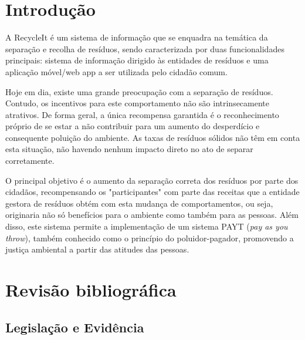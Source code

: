 \documentclass[11pt, a4paper, oneside]{book}
\begin{document}
\frontmatter

{
\linespread{1.000}

\tableofcontents
}

\printglossaries
\glsaddallunused

\mainmatter

\chapter{Introdução}

A RecycleIt é um sistema de informação que se enquadra na temática da separação e recolha de resíduos, sendo caracterizada por duas funcionalidades principais: sistema de informação dirigido às entidades de resíduos e uma aplicação móvel/web app a ser utilizada pelo cidadão comum.

Hoje em dia, existe uma grande preocupação com a separação de resíduos. Contudo, os incentivos para este comportamento não são intrinsecamente atrativos. De forma geral, a única recompensa garantida é o reconhecimento próprio de se estar a não contribuir para um aumento do desperdício e consequente poluição do ambiente. As taxas de resíduos sólidos não têm em conta esta situação, não havendo nenhum impacto direto no ato de separar corretamente.

O principal objetivo é o aumento da separação correta dos resíduos por parte dos cidadãos, recompensando os "participantes"{} com parte das receitas que a entidade gestora de resíduos obtém com esta mudança de comportamentos, ou seja, originaria não só benefícios para o ambiente como também para as pessoas. Além disso, este sistema permite a implementação de um sistema PAYT (\textit{pay as you throw}), também conhecido como o princípio do poluidor-pagador, promovendo a justiça ambiental a partir das atitudes das pessoas.

\chapter{Revisão bibliográfica}

\section{Legislação e Evidência}
\end{document}
